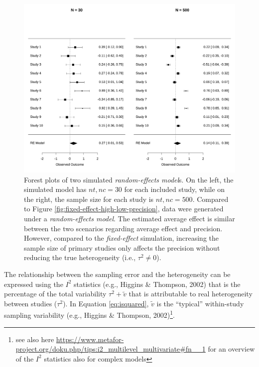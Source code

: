 \documentclass[
  man,floatsintext]{apa6}
\begin{document}
\scriptsize

\begin{figure}[H]

{\centering \includegraphics[width=0.8\linewidth]{paper_files/figure-latex/random-effect-high-low-precision-1} 

}

\caption{Forest plots of two simulated \emph{random-effects model}s. On the left, the simulated model has \(nt,nc = 30\) for each included study, while on the right, the sample size for each study is \(nt,nc = 500\). Compared to Figure \ref{fig:fixed-effect-high-low-precision}, data were generated under a \emph{random-effects model}. The estimated average effect is similar between the two scenarios regarding average effect and precision. However, compared to the \emph{fixed-effect} simulation, increasing the sample size of primary studies only affects the precision without reducing the true heterogeneity (i.e., \(\tau^{2} \neq 0\)).}\label{fig:random-effect-high-low-precision}
\end{figure}

\normalsize

The relationship between the sampling error and the heterogeneity can be expressed using the \(I^{2}\) statistics (e.g., Higgins \& Thompson, 2002) that is the percentage of the total variability \(\tau^{2} + \tilde{v}\) that is attributable to real heterogeneity between studies (\(\tau^{2}\)). In Equation \eqref{eq:isquared}, \(\tilde{v}\) is the ``typical'' within-study sampling variability (e.g., Higgins \& Thompson, 2002)\footnote{see also here \url{https://www.metafor-project.org/doku.php/tips:i2_multilevel_multivariate\#fn__1} for an overview of the \(I^2\) statistics also for complex models}.
\end{document}
